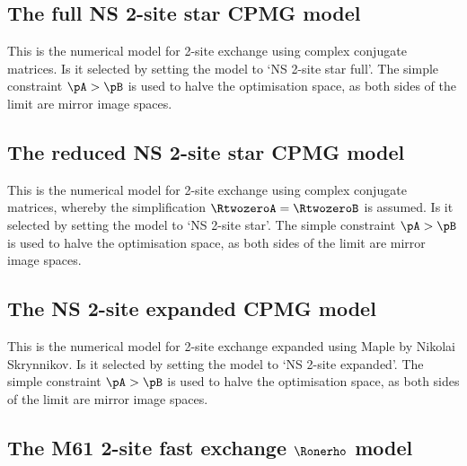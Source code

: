 
\subsection{The full NS 2-site star CPMG model}
\label{sect: dispersion: NS 2-site star full model}

This is the numerical model for 2-site exchange using complex conjugate matrices.
Is it selected by setting the model to `NS 2-site star full'.
The simple constraint $\pA > \pB$ is used to halve the optimisation space, as both sides of the limit are mirror image spaces.



\subsection{The reduced NS 2-site star CPMG model}
\label{sect: dispersion: NS 2-site star model}

This is the numerical model for 2-site exchange using complex conjugate matrices, whereby the simplification $\RtwozeroA = \RtwozeroB$ is assumed.
Is it selected by setting the model to `NS 2-site star'.
The simple constraint $\pA > \pB$ is used to halve the optimisation space, as both sides of the limit are mirror image spaces.



\subsection{The NS 2-site expanded CPMG model}
\label{sect: dispersion: NS 2-site expanded model}

This is the numerical model for 2-site exchange expanded using Maple by Nikolai Skrynnikov.
Is it selected by setting the model to `NS 2-site expanded'.
The simple constraint $\pA > \pB$ is used to halve the optimisation space, as both sides of the limit are mirror image spaces.



\subsection{The M61 2-site fast exchange $\Ronerho$ model}
\label{sect: dispersion: M61 model}

